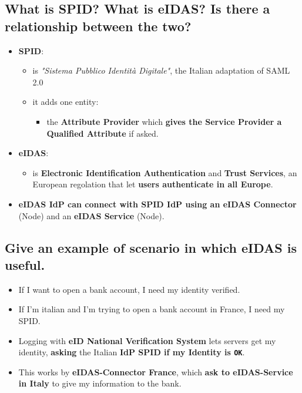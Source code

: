 \documentclass[9pt, letterpaper]{article}
\begin{document}
\subsection{What is SPID? What is eIDAS? Is there a relationship between the two?}
\begin{itemize}
	\item \textbf{SPID}: 
	\begin{itemize}
		\item is \textit{"Sistema Pubblico Identità Digitale"}, the Italian adaptation of SAML 2.0
		\item it adds one entity:	
		\begin{itemize}
			\item the \textbf{Attribute Provider} which \textbf{gives the Service Provider a Qualified Attribute} if asked.
		\end{itemize}
	\end{itemize}
	\item \textbf{eIDAS}:
	\begin{itemize}
		\item is \textbf{Electronic Identification Authentication} and \textbf{Trust Services}, an European regolation that let \textbf{users authenticate in all Europe}.
	\end{itemize}	 
	\item \textbf{eIDAS IdP can connect with SPID IdP using an eIDAS Connector} (Node) and an \textbf{eIDAS Service} (Node).
\end{itemize}

\subsection{Give an example of scenario in which eIDAS is useful.}
\begin{itemize}
	\item If I want to open a bank account, I need my identity verified. 
	\item If I'm italian and I'm trying to open a bank account in France, I need my SPID. 
	\item Logging with \textbf{eID National Verification System} lets servers get my identity, \textbf{asking} the Italian \textbf{IdP SPID if my Identity is {\tt OK}}. 
	\item This works by \textbf{eIDAS-Connector France}, which \textbf{ask to eIDAS-Service in Italy} to give my information to the bank.
\end{itemize}

\newpage
\end{document}
